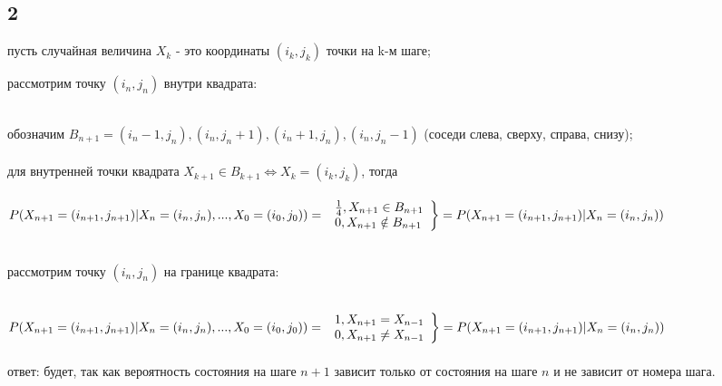 \documentclass[a4paper]{article}
\begin{document}
\begin{large}
	\subsection*{2}
	пусть случайная величина $X_k$ - это координаты $(i_k,j_k)$ точки на k-м шаге;\\
	\begin{bf}
		рассмотрим точку $(i_n,j_n)$ внутри квадрата:\\\\
	\end{bf}
	обозначим $B_{n+1}={(i_n-1,j_n),(i_n,j_n+1),(i_n+1,j_n),(i_n,j_n-1)}$ (соседи слева, сверху, справа, снизу);\\\\
	для внутренней точки квадрата $X_{k+1}\in B_{k+1} \Leftrightarrow X_k=(i_k,j_k)$, тогда\\\\
	$
	P(X_{n+1}=(i_{n+1},j_{n+1})|X_n=(i_n,j_n),...,X_0=(i_0,j_0))=\\\\
	\left.
	\begin{array}{ll}
		\frac{1}{4},X_{n+1}\in B_{n+1}\\
		0,X_{n+1}\notin B_{n+1}
	\end{array}
	\right\}=P(X_{n+1}=(i_{n+1},j_{n+1})|X_n=(i_n,j_n))
	$\\\\
	\begin{bf}
		рассмотрим точку $(i_n,j_n)$ на границе квадрата:\\\\
	\end{bf}
	$
	P(X_{n+1}=(i_{n+1},j_{n+1})|X_n=(i_n,j_n),...,X_0=(i_0,j_0))=\\\\
	\left.
	\begin{array}{ll}
		1,X_{n+1}=X_{n-1}\\
		0,X_{n+1}\ne X_{n-1}
	\end{array}
	\right\}=P(X_{n+1}=(i_{n+1},j_{n+1})|X_n=(i_n,j_n))
	$\\\\
	ответ: будет, так как вероятность состояния на шаге $n+1$ зависит только от состояния на шаге $n$ и не зависит от номера шага.

\end{large}
\end{document}
